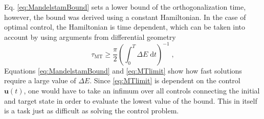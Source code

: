 Eq. \eqref{eq:MandelstamBound} sets a lower bound of the orthogonalization time, however, the bound was derived using a constant Hamiltonian. In the case of optimal control, the Hamiltonian is time dependent, which can be taken into account by using arguments from differential geometry \cite{Aharonov,beyondQSL}
\begin{equation}
	\tau_{\mathrm{MT}} \geq \frac{\pi}{2} \left( \int_{0}^{T} \Delta E \; \mathrm{d}t \right) ^{-1} \; , \label{eq:MTlimit}
\end{equation}
Equations \eqref{eq:MandelstamBound} and \eqref{eq:MTlimit} show how fast solutions require a large value of $\Delta E$. Since \ref{eq:MTlimit} is dependent on the control $\boldsymbol{u}(t)$, one would have to take an infimum over all controls connecting the initial and target state in order to evaluate the lowest value of the bound. This in itself is a task just as difficult as solving the control problem.